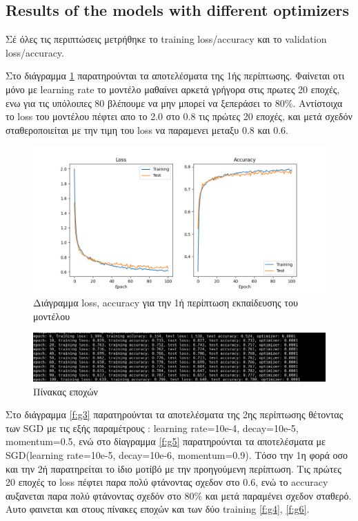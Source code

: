 \subsection{Results of the models with different optimizers}

Σέ όλες τις περιπτώσεις μετρήθηκε το training loss/accuracy και το validation loss/accuracy.  

Στο διάγραμμα \ref{f:g1} παρατηρούνται τα αποτελέσματα της 1ής περίπτωσης. Φαίνεται οτι μόνο με learning rate το μοντέλο μαθαίνει αρκετά γρήγορα στις πρωτες 20 εποχές, ενω για τις υπόλοιπες 80 βλέπουμε να μην μπορεί να ξεπεράσει το 80$\%$. Αντίστοιχα το loss του μοντέλου πέφτει απο το 2.0 στο 0.8 τις πρώτες 20 εποχές, και μετά σχεδόν σταθεροποιείται με την τιμη του loss να παραμενει μεταξυ 0.8 και 0.6.

\begin{figure}[ht]
	\centering
	\includegraphics[width=1\linewidth]{Results/Optimizers/lr_20k.png}
	\caption{ Διάγραμμα loss, accuracy για την 1ή περίπτωση εκπαίδευσης του μοντέλου    }
	\label{f:g1}	
\end{figure}


\begin{figure}[ht]
	\centering
	\includegraphics[width=1\linewidth]{Results/Optimizers/lr_20k1.png}
	\caption{Πίνακας εποχών}
	\label{f:g2}	
\end{figure}
\clearpage

Στο διάγραμμα \ref{f:g3} παρατηρούνται τα αποτελέσματα της 2ης περίπτωσης θέτοντας των SGD με τις εξής παραμέτρους : learning rate=10e-4, decay=10e-5, momentum=0.5, ενώ στο δίαγραμμα \ref{f:g5} παρατηρούνται τα αποτελέσματα με SGD(learning rate=10e-5, decay=10e-6, momentum=0.9). Τόσο την 1η φορά οσο και την 2ή παρατηρείται το ίδιο μοτίβό με την προηγούμενη περίπτωση. Τις πρώτες 20 εποχές το loss πέφτει παρα πολύ φτάνοντας σχεδον στο 0.6, ενώ το accuracy αυξανεται παρα πολύ φτάνοντας σχεδόν στο 80$\%$ και μετά παραμένει σχεδον σταθερό. Αυτο φαινεται και στους πίνακες εποχών και των δύο training \ref{f:g4}, \ref{f:g6}.

